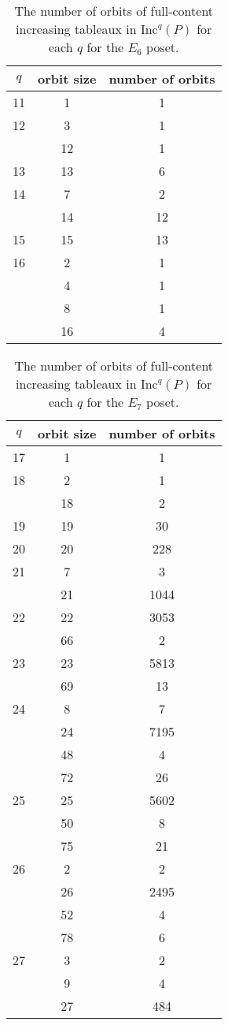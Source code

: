 \documentclass[12pt]{amsart}
\theoremstyle{definition}
\theoremstyle{remark}
\numberwithin{equation}{section}
\newcommand{\inc}{\ensuremath{\mathrm{Inc}}}
\begin{document}
\begin{table}[h]
\begin{tabular}{|c|c|c|}
\hline
$q$ & orbit size & number of orbits\\
  \hline
  11 & 1 & 1\\
  \hline
  12 & 3 & 1\\ \cline{2-3}
   & 12 & 1 \\
   \hline
  13 & 13 & 6\\
  \hline
  14 & 7 & 2\\\cline{2-3}
  & 14 & 12\\
  \hline
    15 & 15 & 13\\
  \hline
  16 & 2 & 1\\\cline{2-3}
   & 4 & 1\\\cline{2-3}
   & 8 & 1\\\cline{2-3}
  & 16 & 4\\
  \hline
\end{tabular}
\caption{The number of orbits of full-content increasing tableaux in $\inc^q(P)$ for each $q$ for the $E_6$ poset.}
\label{tab:E6}
\end{table}

\begin{table}[h]
\begin{tabular}{|c|c|c|}
\hline
$q$ & orbit size & number of orbits\\
  \hline
  17 & 1 & 1\\
  \hline
  18 & 2 & 1\\ \cline{2-3}
   & 18 & 2 \\
   \hline
  19 & 19 & 30\\
  \hline
  20 & 20 & 228\\
  \hline
    21 & 7 & 3\\ \cline{2-3}
    & 21 & 1044 \\
  \hline
  22 & 22 & 3053\\\cline{2-3}
   & 66 & 2\\
  \hline
  23 & 23 & 5813\\ \cline{2-3}
  & 69 & 13 \\
   \hline
  24 & 8 & 7\\\cline{2-3}
   & 24 & 7195\\\cline{2-3}
   & 48 & 4\\\cline{2-3}
   & 72 & 26\\
   \hline
  25 & 25 & 5602\\ \cline{2-3}
  & 50 & 8 \\ \cline{2-3}
  & 75 & 21 \\
   \hline
  26 & 2 & 2\\ \cline{2-3}
  & 26 & 2495 \\ \cline{2-3}
  & 52 & 4 \\ \cline{2-3}
  & 78 & 6 \\
   \hline
 27 & 3 & 2\\ \cline{2-3}
  & 9 & 4 \\ \cline{2-3}
  & 27 & 484 \\
  \hline
\end{tabular}
\caption{The number of orbits of full-content increasing tableaux in $\inc^q(P)$ for each $q$ for the $E_7$ poset.}
\label{tab:E7}
\end{table}
\end{document}
